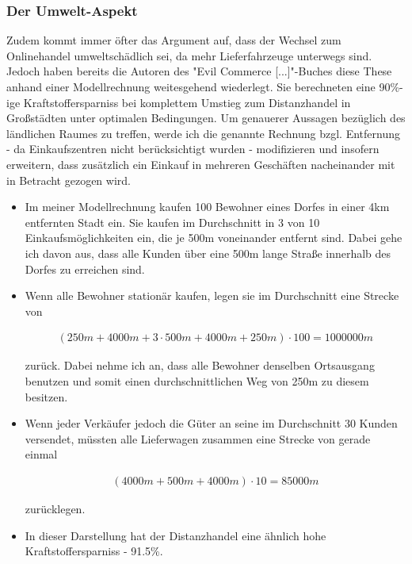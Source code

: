 \begin{folding} \subsubsection{Der Umwelt-Aspekt} %

Zudem kommt immer öfter das Argument auf, dass der Wechsel zum Onlinehandel umweltschädlich sei, da mehr Lieferfahrzeuge unterwegs sind. Jedoch haben bereits die Autoren des "Evil Commerce [...]"-Buches diese These anhand einer Modellrechnung weitesgehend wiederlegt. Sie berechneten eine 90\%-ige Kraftstoffersparniss bei komplettem Umstieg zum Distanzhandel in Großstädten unter optimalen Bedingungen\cite[S. 25f]{evilcom}. Um genauerer Aussagen bezüglich des ländlichen Raumes zu treffen, werde ich die genannte Rechnung bzgl. Entfernung - da Einkaufszentren nicht berücksichtigt wurden - modifizieren und insofern erweitern, dass zusätzlich ein Einkauf in mehreren Geschäften nacheinander mit in Betracht gezogen wird.

\begin{itemize}

\item Im meiner Modellrechnung kaufen 100 Bewohner eines Dorfes in einer 4km entfernten Stadt ein. Sie kaufen im Durchschnitt in 3 von 10 Einkaufsmöglichkeiten ein, die je 500m voneinander entfernt sind. Dabei gehe ich davon aus, dass alle Kunden über eine 500m lange Straße innerhalb des Dorfes zu erreichen sind.

\item Wenn alle Bewohner stationär kaufen, legen sie im Durchschnitt eine Strecke von 

\begin{align}(250m + 4000m + 3 \cdot 500m + 4000m + 250m) \cdot 100 = 1000000m\end{align}

 zurück. Dabei nehme ich an, dass alle Bewohner denselben Ortsausgang benutzen und somit einen durchschnittlichen Weg von 250m zu diesem besitzen.

\item Wenn jeder Verkäufer jedoch die Güter an seine im Durchschnitt 30 Kunden versendet, müssten alle Lieferwagen zusammen eine Strecke von gerade einmal 

\begin{align}(4000m + 500m + 4000m) \cdot 10 = 85000m\end{align}

zurücklegen.
\item In dieser Darstellung hat der Distanzhandel eine ähnlich hohe Kraftstoffersparniss - 91.5\%. 


\end{itemize}
\end{folding}
